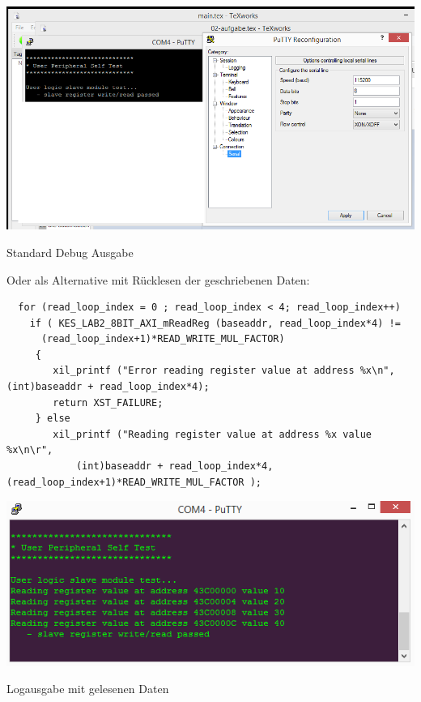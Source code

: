 \begin{minipage}{\textwidth}
    \begin{center}        
        \includegraphics[scale=0.5]{img/debugselftest.png} 
    \end{center}
\end{minipage}
\begin{center}
Standard Debug Ausgabe
\end{center}

Oder als Alternative mit Rücklesen der geschriebenen Daten:
\begin{verbatim}
  for (read_loop_index = 0 ; read_loop_index < 4; read_loop_index++)
    if ( KES_LAB2_8BIT_AXI_mReadReg (baseaddr, read_loop_index*4) !=
      (read_loop_index+1)*READ_WRITE_MUL_FACTOR)
     {
        xil_printf ("Error reading register value at address %x\n", (int)baseaddr + read_loop_index*4);
        return XST_FAILURE;
     } else
        xil_printf ("Reading register value at address %x value %x\n\r",
            (int)baseaddr + read_loop_index*4, (read_loop_index+1)*READ_WRITE_MUL_FACTOR );
\end{verbatim}

\begin{minipage}{\textwidth}
    \begin{center}        
        \includegraphics[scale=0.5]{img/debugselftest2.png} 
    \end{center}
\end{minipage}
\begin{center}
Logausgabe mit gelesenen Daten
\end{center}

